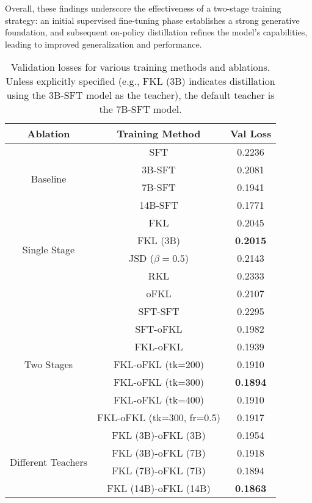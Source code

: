 Overall, these findings underscore the effectiveness of a two-stage training strategy: an initial supervised fine-tuning phase establishes a strong generative foundation, and subsequent on-policy distillation refines the model’s capabilities, leading to improved generalization and performance.



\begin{table}[htbp]
\centering
\begin{tabular}{c c c}
\hline\hline
\textbf{Ablation} & \textbf{Training Method} & \textbf{Val Loss} \\
\hline\hline
\multirow{4}{*}{Baseline} & SFT & 0.2236 \\
& 3B-SFT & 0.2081 \\
& 7B-SFT & 0.1941 \\
& 14B-SFT & 0.1771\\
\hline
\multirow{4}{*}{Single Stage}
& FKL & 0.2045 \\
& FKL (3B) & \textbf{0.2015} \\
& JSD ($\beta=0.5$) & 0.2143 \\
& RKL & 0.2333 \\
& oFKL & 0.2107 \\
\hline
\multirow{7}{*}{Two Stages} & SFT-SFT & 0.2295 \\
& SFT-oFKL & 0.1982 \\
& FKL-oFKL & 0.1939 \\
& FKL-oFKL (tk=200) & 0.1910 \\
& FKL-oFKL (tk=300) & \textbf{0.1894} \\
& FKL-oFKL (tk=400) & 0.1910 \\
& FKL-oFKL (tk=300, fr=0.5) & 0.1917 \\
\hline
\multirow{4}{*}{Different Teachers} & FKL (3B)-oFKL (3B) & 0.1954 \\
& FKL (3B)-oFKL (7B) & 0.1918 \\
& FKL (7B)-oFKL (7B) & 0.1894 \\
& FKL (14B)-oFKL (14B) & \textbf{0.1863} \\
\hline\hline
\end{tabular}
\caption{Validation losses for various training methods and ablations. Unless explicitly specified (e.g., FKL (3B) indicates distillation using the 3B-SFT model as the teacher), the default teacher is the 7B-SFT model.}
\label{tab:distillation_results}
\end{table}





